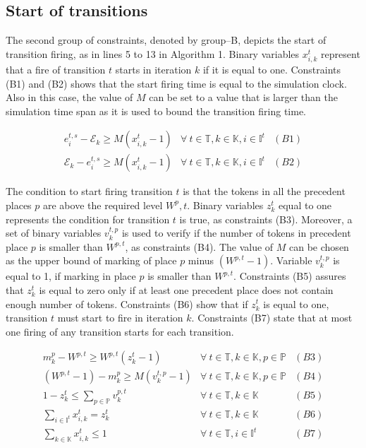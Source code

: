 \documentclass[suppldata]{interact}
\theoremstyle{plain}
\theoremstyle{definition}
\theoremstyle{remark}
\begin{document}
\subsection{Start of transitions} \label{sec:MPR_start_Firing}

The second group of constraints, denoted by group--B, depicts the start of transition firing, as in lines 5 to 13 in Algorithm 1. Binary variables $x^{t}_{i,k}$ represent that a fire of transition $t$ starts in iteration $k$ if it is equal to one. Constraints (B1) and (B2) shows that the start firing time is equal to the simulation clock. Also in this case, the value of $M$ can be set to a value that is larger than the simulation time span as it is used to bound the transition firing time.

\begin{eqnarray}
	e^{t,s}_i-\mathcal{E}_{k} \ge M(x^{t}_{i,k}-1)& \forall\ t\in \mathbb{T},k\in \mathbb{K},i\in \mathbb{I}^{t}&(B1)\nonumber\\
	\mathcal{E}_{k} -e^{t,s}_i\ge M(x^{t}_{i,k}-1)&\forall\ t\in \mathbb{T},k\in \mathbb{K},i\in \mathbb{I}^{t}&(B2)\nonumber%
\end{eqnarray}

The condition to start firing transition $t$ is that the tokens in all the precedent places $p$ are above the required level $W^p,t$. Binary variables $z^{t}_{k}$ equal to one represents the condition for transition $t$ is true, as constraints (B3). Moreover, a set of binary variables $v^{t,p}_k$ is used to verify if the number of tokens in precedent place $p$ is smaller than $W^{p,t}$, as constraints (B4). The value of $M$ can be chosen as the upper bound of marking of place $p$ minus $(W^{p,t}-1)$. Variable $v^{t,p}_k$ is equal to 1, if marking in place $p$ is smaller than $W^{p,t}$. Constraints (B5) assures that $z^{t}_k$ is equal to zero only if at least one precedent place does not contain enough number of tokens. Constraints (B6) show that if $z^{t}_k$ is equal to one, transition $t$ must start to fire in iteration $k$. Constraints (B7) state that at most one firing of any transition starts for each transition.

\begin{eqnarray}
	m^p_k - W^{p,t} \ge W^{p,t}(z^{t}_{k}-1)&\forall\ t\in \mathbb{T},k\in \mathbb{K},p\in \mathbb{P}&(B3)\nonumber\\
	(W^{p,t}-1) - m^p_k \ge M(v^{t,p}_k-1) & \forall\ t\in \mathbb{T},k\in \mathbb{K},p\in \mathbb{P} &(B4)\nonumber\\
	1 - z^{t}_{k} \le \sum_{p\in \mathbb{P}} v^{p,t}_k&\forall\ t\in \mathbb{T},k\in \mathbb{K}&(B5)\nonumber\\
	\sum_{i\in \mathbb{I}^{t}} x^{t}_{i,k} = z^{t}_k&\forall\ t\in \mathbb{T},k\in \mathbb{K}&(B6)\nonumber\\
	\sum_{k\in \mathbb{K}} x^{t}_{i,k} \le 1& \forall\ t\in \mathbb{T},i\in \mathbb{I}^{t}&(B7)\nonumber
\end{eqnarray}
\end{document}
